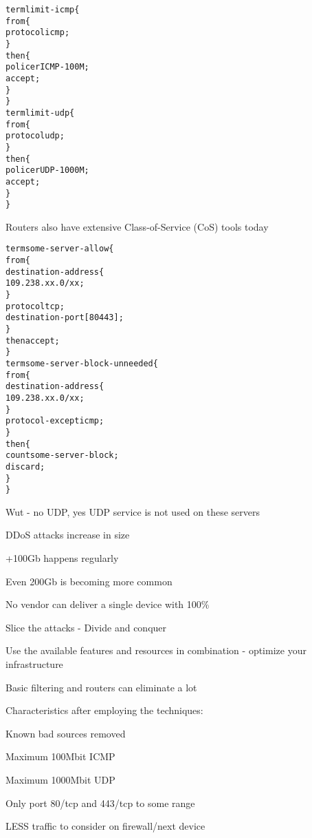 \documentclass[20pt,landscape,a4paper,footrule]{foils}
\begin{document}





\begin{alltt}\footnotesize
term limit-icmp \{
    from \{
        protocol icmp;
    \}
    then \{
        policer ICMP-100M;
        accept;
    \}
\}
term limit-udp \{
    from \{
        protocol udp;
    \}
    then \{
        policer UDP-1000M;
        accept;
    \}
\}
\end{alltt}

Routers also have extensive Class-of-Service (CoS) tools today


\begin{alltt}\footnotesize
term some-server-allow \{
    from \{
        destination-address \{
            109.238.xx.0/xx;
        \}
        protocol tcp;
        destination-port [ 80 443 ];
    \}
    then accept;
\}
term some-server-block-unneeded \{
    from \{
        destination-address \{
            109.238.xx.0/xx;
        \}
        protocol-except icmp;
    \}
    then \{
        count some-server-block;
        discard;
    \}
\}
\end{alltt}

Wut - no UDP, yes UDP service is not used on these servers



\begin{list1}
\item DDoS attacks increase in size
\item +100Gb happens regularly
\item Even 200Gb is becoming more common
\item No vendor can deliver a single device with 100\%
\item Slice the attacks - Divide and conquer
\item Use the available features and resources in combination - optimize your infrastructure
\end{list1}


\begin{list1}
\item Basic filtering and routers can eliminate a lot

\item Characteristics after employing the techniques:
\item Known bad sources removed
\item Maximum 100Mbit ICMP
\item Maximum 1000Mbit UDP
\item Only port 80/tcp and 443/tcp to some range
\end{list1}
\centerline{LESS traffic to consider on firewall/next device}
\end{document}
